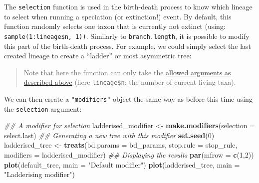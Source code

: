 \documentclass[
]{book}
\newenvironment{Shaded}{\begin{snugshade}}{\end{snugshade}}
\newcommand{\CommentTok}[1]{\textcolor[rgb]{0.56,0.35,0.01}{\textit{#1}}}
\newcommand{\ControlFlowTok}[1]{\textcolor[rgb]{0.13,0.29,0.53}{\textbf{#1}}}
\newcommand{\DataTypeTok}[1]{\textcolor[rgb]{0.13,0.29,0.53}{#1}}
\newcommand{\DecValTok}[1]{\textcolor[rgb]{0.00,0.00,0.81}{#1}}
\newcommand{\KeywordTok}[1]{\textcolor[rgb]{0.13,0.29,0.53}{\textbf{#1}}}
\newcommand{\NormalTok}[1]{#1}
\newcommand{\OperatorTok}[1]{\textcolor[rgb]{0.81,0.36,0.00}{\textbf{#1}}}
\newcommand{\StringTok}[1]{\textcolor[rgb]{0.31,0.60,0.02}{#1}}
\begin{document}
The \texttt{selection} function is used in the birth-death process to know which lineage to select when running a speciation (or extinction!) event.
By default, this function randomly selects one taxon that is currently not extinct (using: \texttt{sample(1:lineage\$n,\ 1))}.
Similarly to \texttt{branch.length}, it is possible to modify this part of the birth-death process.
For example, we could simply select the last created lineage to create a ``ladder'' or most asymmetric tree:

\begin{Shaded}
\end{Shaded}

\begin{quote}
Note that here the function can only take the \protect\hyperlink{allowarguments}{allowed arguments as described above} (here \texttt{lineage\$n}: the number of current living taxa).
\end{quote}

We can then create a \texttt{"modifiers"} object the same way as before this time using the \texttt{selection} argument:

\begin{Shaded}
\begin{Highlighting}[]
\CommentTok{\#\# A modifier for selection}
\NormalTok{ladderised\_modifier \textless{}{-}}\StringTok{ }\KeywordTok{make.modifiers}\NormalTok{(}\DataTypeTok{selection =}\NormalTok{ select.last)}
\CommentTok{\#\# Generating a new tree with this modifier}
\KeywordTok{set.seed}\NormalTok{(}\DecValTok{0}\NormalTok{)}
\NormalTok{ladderised\_tree \textless{}{-}}\StringTok{ }\KeywordTok{treats}\NormalTok{(}\DataTypeTok{bd.params =}\NormalTok{ bd\_params,}
                        \DataTypeTok{stop.rule =}\NormalTok{ stop\_rule,}
                        \DataTypeTok{modifiers =}\NormalTok{ ladderised\_modifier)}
\CommentTok{\#\# Displaying the results}
\KeywordTok{par}\NormalTok{(}\DataTypeTok{mfrow =} \KeywordTok{c}\NormalTok{(}\DecValTok{1}\NormalTok{,}\DecValTok{2}\NormalTok{))}
\KeywordTok{plot}\NormalTok{(default\_tree,    }\DataTypeTok{main =} \StringTok{"Default modifier"}\NormalTok{)}
\KeywordTok{plot}\NormalTok{(ladderised\_tree, }\DataTypeTok{main =} \StringTok{"Ladderising modifier"}\NormalTok{)}
\end{Highlighting}
\end{Shaded}
\end{document}
